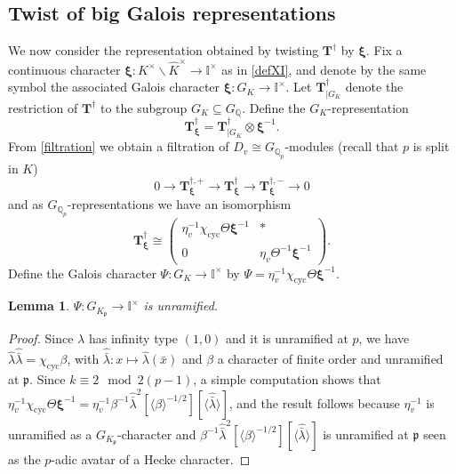 \documentclass[a4paper,11pt]{amsart}
\numberwithin{equation}{section}
\theoremstyle{plain}
\newtheorem{lemma}[theorem]{Lemma}
\theoremstyle{definition}
\theoremstyle{remark}
\newcommand{\Q}{\mathbb Q}
\newcommand{\I}{\mathbb{I}}
\newcommand{\cyc}{{\mathrm{cyc}}}
\newcommand{\mat}[4]{\left(\begin{array}{cc}#1&#2\\#3&#4\end{array}\right)}
\begin{document}
\subsection{Twist of big Galois representations}\label{subsec.TwistGaloisHecke}
We now consider the representation obtained by twisting $\mathbf{T}^\dagger$ by $\boldsymbol{\xi}$. Fix a continuous character 
$\boldsymbol{\xi}\colon K^\times\backslash\widehat{K}^\times\rightarrow\I^\times$ as in \eqref{defXI}, 
and denote by the same symbol the associated Galois character $\boldsymbol{\xi}\colon G_K\rightarrow\I^\times$.
Let $\mathbf{T}^\dagger_{|G_K}$ denote the restriction of $\mathbf{T}^\dagger$ to the subgroup $G_K\subseteq G_\Q$. 
Define the $G_K$-representation 
\[\mathbf{T}^\dagger_{\boldsymbol{\xi}}=
\mathbf{T}^\dagger_{|G_K}\otimes\boldsymbol{\xi}^{-1}.\] From \eqref{filtration} we obtain a filtration 
of $D_v\cong  G_{\Q_p}$-modules (recall that $p$ is split in $K$) 
\begin{equation*}\label{filtration1}
0\longrightarrow \mathbf{T}^{\dagger,+}_{\boldsymbol{\xi}}
\longrightarrow  \mathbf{T}^\dagger_{\boldsymbol{\xi}}\longrightarrow\mathbf{T}^{\dagger,-}_{\boldsymbol{\xi}}\longrightarrow 0 
\end{equation*} and as $G_{\Q_p}$-representations we have an isomorphism 
\[\mathbf{T}^\dagger_{\boldsymbol{\xi}}\cong \mat{\eta_v^{-1}\chi_\cyc\Theta\boldsymbol{\xi}^{-1}}{*}{0}{\eta_v\Theta^{-1}\boldsymbol{\xi}^{-1}}.\]
Define the Galois character $\Psi\colon G_K\rightarrow\I^\times$ by 
$\Psi=\eta_v^{-1}\chi_\cyc\Theta\boldsymbol{\xi}^{-1}$. 
\begin{lemma}\label{lemmaunram} $\Psi\colon G_{K_\mathfrak{p}}\rightarrow\I^\times$ is unramified. 
\end{lemma}
\begin{proof} Since $\lambda$ has infinity type $(1,0)$ and it is unramified at $p$, we have  $\hat{\lambda}\hat{\bar{\lambda}}=\chi_{\cyc} \beta$, with $\hat{\bar{\lambda}}\colon  x \mapsto \hat{\lambda}(\bar{x})$ and $\beta$ a character of finite order and unramified at $\mathfrak{p}$. 
Since $k \equiv 2 \mod{2(p-1)}$, a simple computation shows that 
$\eta_v^{-1} \chi_\cyc \Theta \boldsymbol{\xi}^{-1} = \eta_v^{-1} \beta^{-1}\hat{\bar{\lambda}}^2 [\langle \beta\rangle^{-1/2}] [\langle \hat{\bar{\lambda}}\rangle]$,
and the result follows because 
$\eta_v^{-1}$ is unramified as a $G_{K_\mathfrak{p}}$-character and $\beta^{-1}\hat{\bar{\lambda}}^2 [\langle \beta\rangle^{-1/2}] [\langle \hat{\bar{\lambda}}\rangle]$ is unramified at $\mathfrak{p}$ seen as the $p$-adic avatar  of a Hecke character.
\end{proof}
\end{document}
